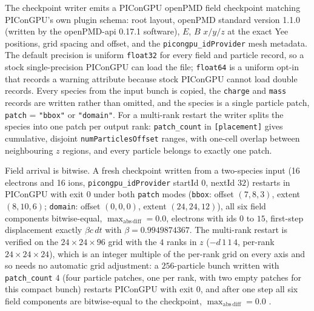 The checkpoint writer emits a PIConGPU openPMD field checkpoint matching
PIConGPU's own plugin schema: root layout, openPMD standard version 1.1.0
\citep{openpmd} (written by the openPMD-api 0.17.1 software), $E$, $B$
$x/y/z$ at the exact Yee positions, grid spacing
and offset, and the \texttt{picongpu\_idProvider} mesh metadata. The
default precision is uniform \texttt{float32} for every field and particle
record, so a stock single-precision PIConGPU can load the file;
\texttt{float64} is a uniform opt-in that records a warning attribute
because stock PIConGPU cannot load double records. Every species from the
input bunch is copied, the \texttt{charge} and \texttt{mass} records are
written rather than omitted, and the species is a single particle patch,
\texttt{patch} = \texttt{"bbox"} or \texttt{"domain"}. For a multi-rank
restart the writer splits the species into one patch per output rank:
\texttt{patch\_count} in \texttt{[placement]} gives cumulative, disjoint
\texttt{numParticlesOffset} ranges, with one-cell overlap between
neighbouring $z$ regions, and every particle belongs to exactly one patch.

Field arrival is bitwise. A fresh checkpoint written from a two-species
input (16 electrons and 16 ions, \texttt{picongpu\_idProvider} startId $0$,
nextId $32$) restarts in PIConGPU with exit 0 under both \texttt{patch}
modes (\texttt{bbox}: offset $(7,8,3)$, extent $(8,10,6)$;
\texttt{domain}: offset $(0,0,0)$, extent $(24,24,12)$), all six field
components bitwise-equal, $\max_\mathrm{abs\,diff} = 0.0$, electrons with
ids $0$ to $15$, first-step displacement exactly $\beta c\,dt$ with
$\beta = 0.9949874367$. The multi-rank restart is verified on the
$24\times24\times96$ grid with the $4$ ranks in $z$ ($-d\,1\,1\,4$,
per-rank $24\times24\times24$), which is an integer multiple of the
per-rank grid on every axis and so needs no automatic grid adjustment:
a $256$-particle bunch written with \texttt{patch\_count} $4$ (four
particle patches, one per rank, with two empty patches for this compact
bunch) restarts PIConGPU with exit 0, and after one step all six field
components are bitwise-equal to the checkpoint,
$\max_\mathrm{abs\,diff}=0.0$
\citep[measured in]{restart4measure}.

